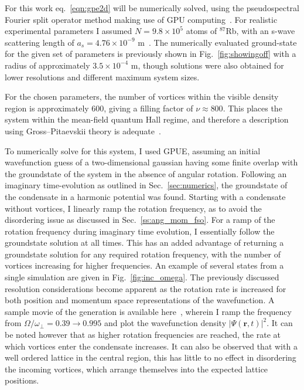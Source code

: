For this work eq.~\eqref{eqn:gpe2d} will be numerically solved, using the pseudospectral Fourier split operator method making use of GPU computing~\cite{sec:GPUE}. For realistic experimental parameters I assumed  $N=9.8\times 10^5$ atoms of $^{87}$Rb, with an s-wave scattering length of $a_s=4.76\times10^{-9}$ m~\cite{AO:Roberts_prl_1998}. The numerically evaluated ground-state for the given set of parameters is previously shown in Fig.~\ref{fig:showingoff} with a radius of approximately $3.5\times 10^{-4}$ m, though solutions were also obtained for lower resolutions and different maximum system sizes.



For the chosen parameters, the number of vortices within the visible density region is approximately 600, giving a filling factor of $\nu \approx 800 $. This places the system within the mean-field quantum Hall regime, and therefore a description using Gross--Pitaevskii theory is adequate~\cite{Vtx:Schweikhard_prl_2004}.

To numerically solve for this system, I used GPUE, assuming an initial wavefunction guess of a two-dimensional gaussian having some finite overlap with the groundstate of the system in the absence of angular rotation. Following an imaginary time-evolution as outlined in Sec.~\ref{sec:numerics}, the groundstate of the condensate in a harmonic potential was found. Starting with a condensate without vortices, I linearly ramp the rotation frequency, as to avoid the disordering issue as discussed in Sec.~\ref{ss:ang_mom_fso}. For a ramp of the rotation frequency during imaginary time evolution, I essentially follow the groundstate solution at all times. This has an added advantage of returning a groundstate solution for any required rotation frequency, with the number of vortices increasing for higher frequencies. An example of several states from a single simulation are given in Fig.~\ref{fig:inc_omega}. The previously discussed resolution considerations become apparent as the rotation rate is increased for both position and momentum space representations of the wavefunction. A sample movie of the generation is available here~\cite{goo.gl/30Mj1q}, wherein I ramp the frequency from $\Omega/\omega_\perp = 0.39 \to 0.995$ and plot the wavefunction density $|\Psi(\mathbf{r},t)|^2$. It can be noted however that as higher rotation frequencies are reached, the rate at which vortices enter the condensate increases. It can also be observed that with a well ordered lattice in the central region, this has little to no effect in disordering the incoming vortices, which arrange themselves into the expected lattice positions.

